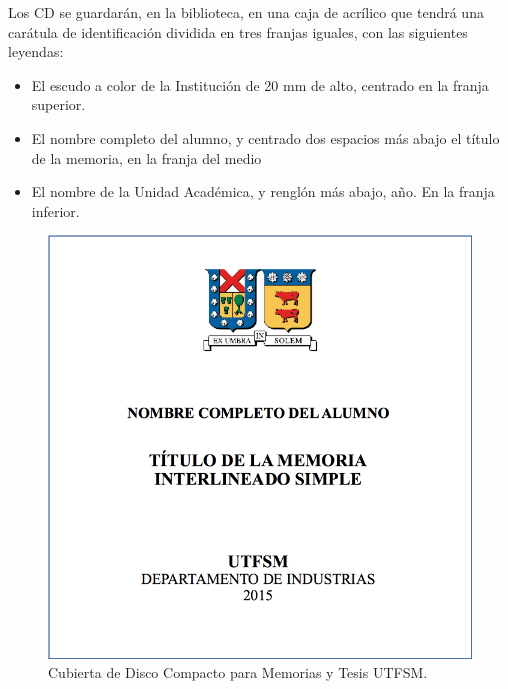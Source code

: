 Los CD se guardarán, en la biblioteca, en una caja de acrílico que tendrá una carátula de identificación dividida en tres franjas iguales, con las siguientes leyendas:
\begin{itemize}
		\item
    El escudo a color de la Institución de 20 mm de alto, centrado en la franja superior.
		\item
    El nombre completo del alumno, y centrado dos espacios más abajo el título de la memoria, en la franja del medio
		\item
    El nombre de la Unidad Académica, y renglón más abajo, año. En la franja inferior.
\end{itemize}


\begin{figure}[ht!]
    \centering
    \includegraphics[width=.4\textwidth]{figures/thesis_cd_cover.png}
    \caption{Cubierta de Disco Compacto para Memorias y Tesis UTFSM.}
    \label{fig:thesis_cd_cover}
\end{figure}


